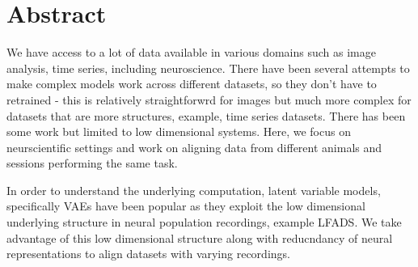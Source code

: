 \section{Abstract}
We have access to a lot of data available in various domains such as image analysis, time series, including neuroscience. 
There have been several attempts to make complex models work across different datasets, so they don't have to retrained - this is relatively straightforwrd 
for images but much more complex for datasets that are more structures, example, time series datasets. There has been some work but limited to low dimensional systems.
Here, we focus on neurscientific settings and work on aligning data from different animals and sessions performing the same task.

In order to understand the 
underlying computation, latent variable models, specifically VAEs have been popular as they exploit the low dimensional underlying structure in neural population
recordings, example LFADS. We take advantage of this low dimensional structure along with reducndancy of neural representations to align datasets with varying recordings.


